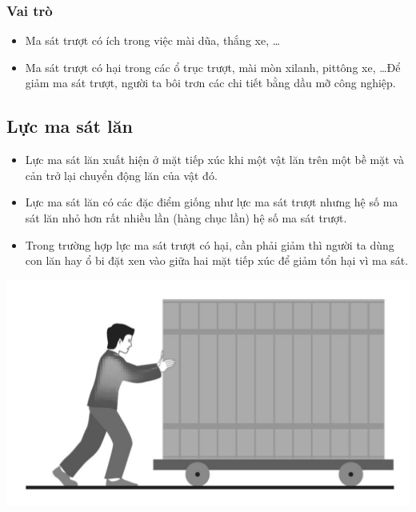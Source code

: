 \subsubsection{Vai trò}
\begin{itemize}
	\item Ma sát trượt có ích trong việc mài dũa, thắng xe, \dots
	\item Ma sát trượt có hại trong các ổ trục trượt, mài mòn xilanh, pittông xe, \dots Để giảm ma sát trượt, người ta bôi trơn các chi tiết bằng dầu mỡ công nghiệp.
\end{itemize}
\subsection{Lực ma sát lăn}
\begin{itemize}
	\item Lực ma sát lăn xuất hiện ở mặt tiếp xúc khi một vật lăn trên một bề mặt và cản trở lại chuyển động lăn của vật đó.
	\item Lực ma sát lăn có các đặc điểm giống như lực ma sát trượt nhưng hệ số ma sát lăn nhỏ hơn rất nhiều lần (hàng chục lần) hệ số ma sát trượt.
	\item Trong trường hợp lực ma sát trượt có hại, cần phải giảm thì người ta dùng con lăn hay ổ bi đặt xen vào giữa hai mặt tiếp xúc để giảm tổn hại vì ma sát.
\end{itemize}
\begin{center}
	\includegraphics[scale=0.25]{../figs/VN10-PH-15-L-012-1-V2-02.JPG}
\end{center}

